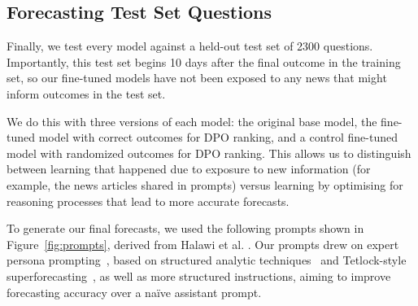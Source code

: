 \documentclass{article}
\begin{document}
\subsection{Forecasting Test Set Questions}
Finally, we test every model against a held-out test set of 2300 questions. Importantly, this test set begins 10 days after the final outcome in the training set, so our fine-tuned models have not been exposed to any news that might inform outcomes in the test set.

We do this with three versions of each model: the original base model, the fine-tuned model with correct outcomes for DPO ranking, and a control fine-tuned model with randomized outcomes for DPO ranking. This allows us to distinguish between learning that happened due to exposure to new information (for example, the news articles shared in prompts) versus learning by optimising for reasoning processes that lead to more accurate forecasts.

To generate our final forecasts, we used the following prompts shown in Figure~\ref{fig:prompts}, derived from Halawi et al. \cite{Halawi2024}. Our prompts drew on expert persona prompting \cite{XuExpertprompting2023}, based on structured analytic techniques \cite{Pherson2019} and Tetlock-style superforecasting \cite{Tetlock2016}, as well as more structured instructions, aiming to improve forecasting accuracy over a naïve assistant prompt.

\captionsetup{type=figure}
\label{fig:prompts}
\end{document}
